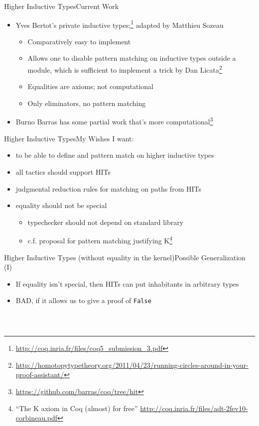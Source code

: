 \documentclass{beamer}
\begin{document}
\begin{frame}{Higher Inductive Types}{Current Work}
  \Large
  \begin{itemize}
    \item Yves Bertot's private inductive types;\footnote{\url{http://coq.inria.fr/files/coq5\_submission_3.pdf}} adapted by Matthieu Sozeau \pause
      \begin{itemize} \large
        \item Comparatively easy to implement \pause
        \item Allows one to disable pattern matching on inductive types outside a module, which is sufficient to implement a trick by Dan Licata\footnote<3->{\url{http://homotopytypetheory.org/2011/04/23/running-circles-around-in-your-proof-assistant/}} \pause
        \item Equalities are axioms; not computational \pause
        \item Only eliminators, no pattern matching \pause
      \end{itemize}
    \item Burno Barras has some partial work that's more computational\footnote<6->{\url{https://github.com/barras/coq/tree/hit}}
  \end{itemize}
\end{frame}

\begin{frame}{Higher Inductive Types}{My Wishes}
  \Large
  I want: \pause
  \begin{itemize}
	\item to be able to define and pattern match on higher inductive types \pause
	\item all tactics should support HITs \pause
	\item judgmental reduction rules for matching on paths from HITs \pause
	\item equality should not be special \pause
	  \begin{itemize} \large
	    \item typechecker should not depend on standard library \pause
	    \item c.f. proposal for pattern matching justifying K\footnote<7->{``The K axiom in Coq (almost) for free'' \url{http://coq.inria.fr/files/adt-2fev10-corbineau.pdf}}
	  \end{itemize}
  \end{itemize}
\end{frame}

\begin{frame}[fragile]{Higher Inductive Types (without equality in the kernel)}{Possible Generalization (I)}
  \Large
  \begin{itemize}
    \item If equality isn't special, then HITs can put inhabitants in arbitrary types \pause
    \item BAD, if it allows us to give a proof of \texttt{False}
  \end{itemize}
\begin{verbatim}



\end{verbatim}
\end{frame}
\end{document}
